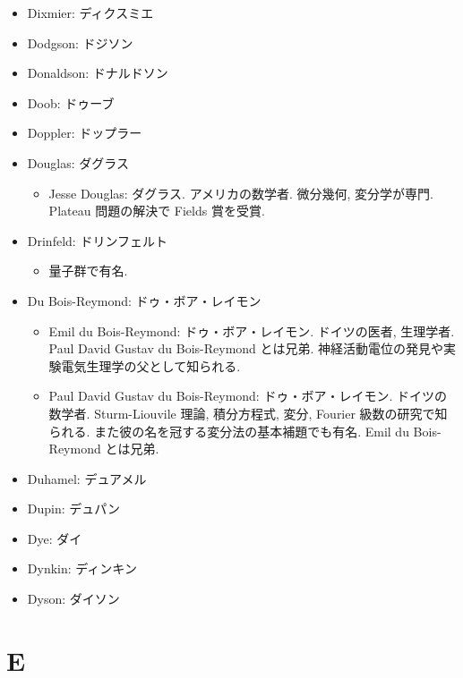 \documentclass[openany, a4paper, oneside]{jsbook}
\begin{document}
\begin{itemize}
\item Dixmier: ディクスミエ
\item Dodgson: ドジソン
\item Donaldson: ドナルドソン
\item Doob: ドゥーブ
\item Doppler: ドップラー
\item Douglas: ダグラス
\begin{itemize}
\item Jesse Douglas: ダグラス. アメリカの数学者. 微分幾何, 変分学が専門. Plateau 問題の解決で Fields 賞を受賞.
\end{itemize}
\item Drinfeld: ドリンフェルト
\begin{itemize}
\item 量子群で有名.
\end{itemize}
\item Du Bois-Reymond: ドゥ・ボア・レイモン
\begin{itemize}
\item Emil du Bois-Reymond: ドゥ・ボア・レイモン. ドイツの医者, 生理学者. Paul David Gustav du Bois-Reymond とは兄弟. 神経活動電位の発見や実験電気生理学の父として知られる.
\item Paul David Gustav du Bois-Reymond: ドゥ・ボア・レイモン. ドイツの数学者. Sturm-Liouvile 理論, 積分方程式, 変分, Fourier 級数の研究で知られる. また彼の名を冠する変分法の基本補題でも有名. Emil du Bois-Reymond とは兄弟.
\end{itemize}
\item Duhamel: デュアメル
\item Dupin: デュパン
\item Dye: ダイ
\item Dynkin: ディンキン
\item Dyson: ダイソン
\end{itemize}
\section{E}
\end{document}
